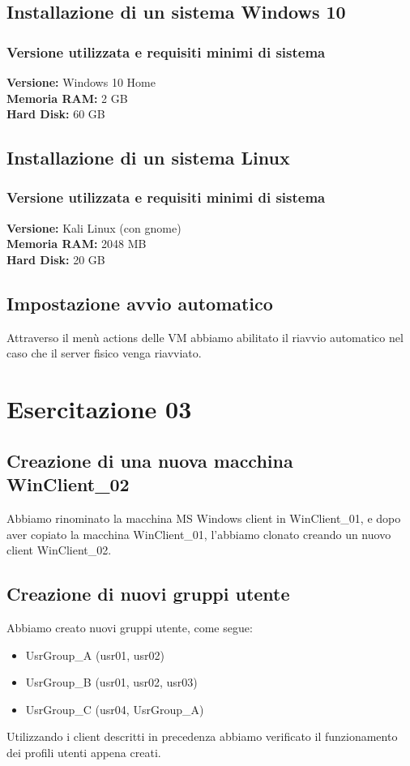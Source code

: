 \documentclass{article}
\begin{document}
\subsection{Installazione di un sistema Windows 10}
\subsubsection{Versione utilizzata e requisiti minimi di sistema}
\textbf{Versione:} Windows 10 Home\\
\textbf{Memoria RAM:} 2 GB \\
\textbf{Hard Disk:} 60 GB

\subsection{Installazione di un sistema Linux}
\subsubsection{Versione utilizzata e requisiti minimi di sistema}
\textbf{Versione:} Kali Linux (con gnome) \\
\textbf{Memoria RAM:} 2048 MB \\
\textbf{Hard Disk:} 20 GB

\subsection{Impostazione avvio automatico}
Attraverso il menù actions delle VM abbiamo abilitato il riavvio automatico nel caso che il server fisico venga
riavviato.
\section{Esercitazione 03}
\subsection{Creazione di una nuova macchina WinClient\_02}
Abbiamo rinominato la macchina MS Windows client in WinClient\_01, e dopo aver copiato la macchina WinClient\_01, l'abbiamo clonato creando un nuovo client WinClient\_02.

\subsection{Creazione di nuovi gruppi utente}
Abbiamo creato nuovi gruppi utente, come segue:
\begin{itemize}
    \item UsrGroup\_A (usr01, usr02)
    \item UsrGroup\_B (usr01, usr02, usr03)
    \item UsrGroup\_C (usr04, UsrGroup\_A)
\end{itemize}
Utilizzando i client descritti in precedenza abbiamo verificato il funzionamento dei profili utenti appena creati.
\end{document}
